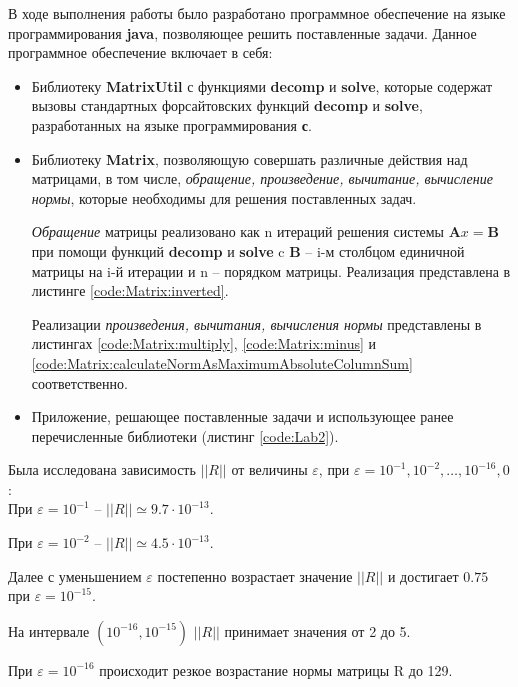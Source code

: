 В ходе выполнения работы было разработано программное обеспечение на языке программирования \textbf{java}, позволяющее решить поставленные задачи. Данное программное обеспечение включает в себя:
\begin{itemize}

\item Библиотеку \textbf{MatrixUtil} с функциями \textbf{decomp} и \textbf{solve}, которые содержат вызовы стандартных форсайтовских функций \textbf{decomp} и \textbf{solve}, разработанных на языке программирования \textbf{с}.

\item Библиотеку \textbf{Matrix}, позволяющую совершать различные действия над матрицами, в том числе, \textit{обращение, произведение, вычитание, вычисление нормы}, которые необходимы для решения поставленных задач.

 \textit{Обращение} матрицы реализовано как n итераций решения системы $\textbf{A}x = \textbf{B}$ при помощи функций \textbf{decomp} и \textbf{solve} c $\textbf{B}$ -- i-м столбцом единичной матрицы на i-й итерации и n -- порядком матрицы. Реализация представлена в листинге \ref{code:Matrix:inverted}.
 
 Реализации \textit{произведения, вычитания, вычисления нормы} представлены в листингах \ref{code:Matrix:multiply}, \ref{code:Matrix:minus} и \ref{code:Matrix:calculateNormAsMaximumAbsoluteColumnSum} соответственно.

\item Приложение, решающее поставленные задачи и использующее ранее перечисленные библиотеки (листинг \ref{code:Lab2}).

\end{itemize} 

Была исследована зависимость $||R||$ от величины $\varepsilon$, при $\varepsilon = 10^{-1}, 10^{-2}, \dots, 10^{-16}, 0$:\\[3mm]

При $\varepsilon = 10^{-1}$ -- $||R|| \simeq 9.7 \cdot 10^{-13}$.

При $\varepsilon = 10^{-2}$ -- $||R|| \simeq 4.5 \cdot 10^{-13}$.

Далее с уменьшением $\varepsilon$ постепенно возрастает значение $||R||$ и достигает $0.75$ при $\varepsilon = 10^{-15}$.

На интервале $(10^{-16}, 10^{-15})$ $||R||$ принимает значения от 2 до 5.

При $\varepsilon = 10^{-16}$ происходит резкое возрастание нормы матрицы R до 129.

